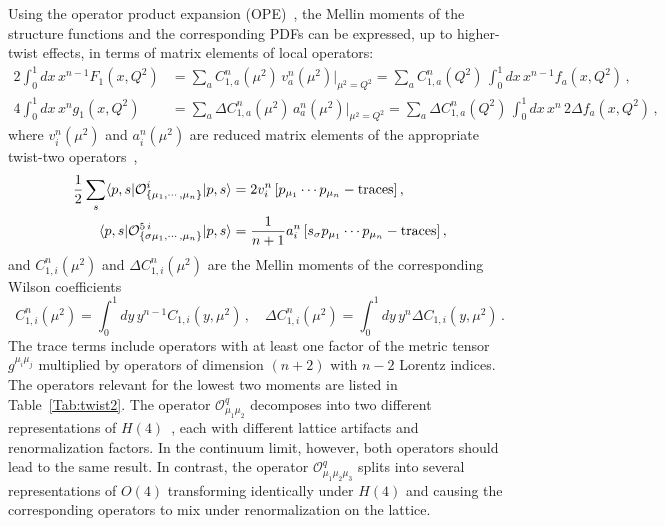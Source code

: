 Using the operator product expansion (OPE)~\cite{Zimmermann:1972tv}, the Mellin 
moments of the structure functions and the corresponding PDFs can be expressed, 
up to higher-twist effects, in terms of matrix elements of local operators:
\begin{align}
\!\!\!2 \int_0^1 dx\, x^{n-1} F_1(x,Q^2) &= \sum_a C_{1,a}^n(\mu^2)\, v_a^n(\mu^2)|_{\mu^2=Q^2} = \sum_a C_{1,a}^n(Q^2)\, \int_0^1 dx\, x^{n-1} f_a(x,Q^2)\,,\\
4 \int_0^1 dx\, x^n g_1(x,Q^2) &= \sum_a \Delta C_{1,a}^n(\mu^2)\, a_a^n(\mu^2)|_{\mu^2=Q^2} = \sum_a \Delta C_{1,a}^n(Q^2)\, \int_0^1 dx\, x^n\, 2 \Delta f_a(x,Q^2)\,,
\end{align}
where $v_i^n(\mu^2)$ and $a_i^n(\mu^2)$ are reduced matrix elements of the appropriate twist-two operators~\cite{Gockeler:1995wg},
\begin{align}
\frac{1}{2} \sum_s \langle p,s|\mathcal{O}^i_{\{\mu_1,\cdots,\mu_n\}}|p,s\rangle = {} & 2 v_i^n\, [p_{\mu_1}\cdots p_{\mu_n} - {\rm traces}] \,, \label{eq:twist2me}\\
\langle p,s|\mathcal{O}^{5\,i}_{\{\sigma \mu_1,\cdots,\mu_n\}}|p,s\rangle = {} & \frac{1}{n+1} a_i^n\, [s_\sigma p_{\mu_1}\cdots p_{\mu_n} - {\rm traces}]\,,
\end{align}
and $C_{1,i}^n(\mu^2)$ and $\Delta C_{1,i}^n(\mu^2)$ are the Mellin moments of the corresponding Wilson coefficients
\begin{equation}
C_{1,i}^n(\mu^2) = \int_0^1 dy\, y^{n-1} C_{1,i}(y,\mu^2)\,, \quad
\Delta C_{1,i}^n(\mu^2) = \int_0^1 dy\, y^n \Delta C_{1,i}(y,\mu^2)\,.
\end{equation}
The trace terms include operators with at least one factor of the metric 
tensor $g^{\mu_i \mu_j}$ multiplied by operators of dimension $(n+2)$ with 
$n-2$ Lorentz indices. 
%
The operators relevant for the lowest two moments are listed in 
Table~\ref{Tab:twist2}. 
%
The operator $\mathcal{O}^q_{\mu_1\mu_2}$ decomposes into two different 
representations of $H(4)$~\cite{Gockeler:1996mu}, each with different 
lattice artifacts and renormalization factors. 
%
In the continuum limit, however, both operators should lead to the same result. 
%
In contrast, the operator $\mathcal{O}^q_{\mu_1\mu_2\mu_3}$ splits into several 
representations of $O(4)$ transforming identically under $H(4)$ and causing 
the corresponding operators to mix under renormalization on the lattice.

